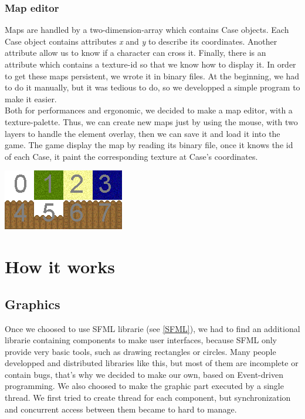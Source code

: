 \documentclass{scrreprt}
\begin{document}
		  \subsection{Map editor}
		Maps are handled by a two-dimension-array which contains Case objects. Each Case object contains attributes \emph{x} and \emph{y} to describe its coordinates. Another attribute allow us to know if a character can cross it. Finally, there is an attribute which contains a texture-id so that we know how to display it. In order to get these maps persistent, we wrote it in binary files. At the beginning, we had to do it manually, but it was tedious to do, so we developped a simple program to make it easier.\\

		Both for performances and ergonomic, we decided to make a map editor, with a texture-palette. Thus, we can create new maps just by using the mouse, with two layers to handle the element overlay, then we can save it and load it into the game. The game display the map by reading its binary file, once it knows the id of each Case, it paint the corresponding texture at Case's coordinates.

		\begin{center}
		\includegraphics{image1.png}
		\end{center}
		

		  \chapter{How it works}
		  \section{Graphics}
		  Once we choosed to use SFML librarie (see \ref{SFML}), we had to find an additional librarie containing components to make user interfaces, because SFML only provide very basic tools, such as drawing rectangles or circles. Many people developped and distributed libraries like this, but most of them are incomplete or contain bugs, that's why we decided to make our own, based on Event-driven programming. We also choosed to make the graphic part executed by a single thread. We first tried to create thread for each component, but synchronization and concurrent access between them became to hard to manage.
\end{document}
